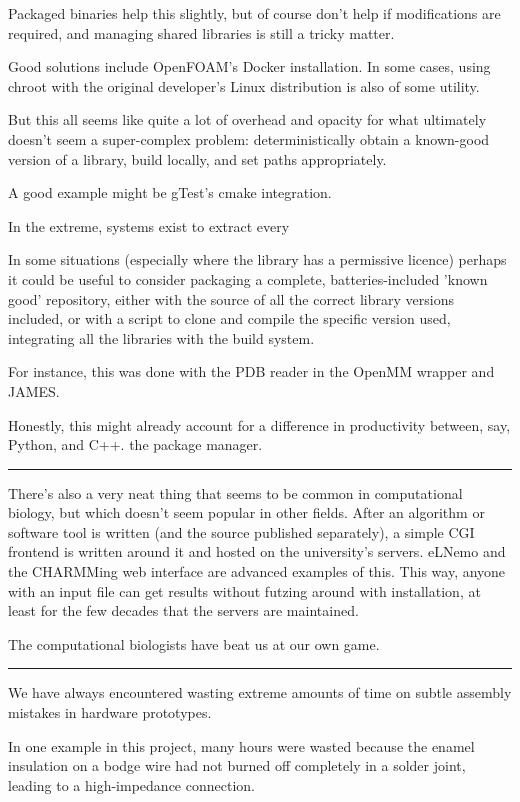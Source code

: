 \documentclass[paper.tex]{subfiles}
\begin{document}
Packaged binaries help this slightly, but of course don't help if modifications are required, and managing shared libraries is still a tricky matter.

Good solutions include OpenFOAM's Docker installation. In some cases, using chroot with the original developer's Linux distribution is also of some utility.

But this all seems like quite a lot of overhead and opacity for what ultimately doesn't seem a super-complex problem: deterministically obtain a known-good version of a library, build locally, and set paths appropriately.

A good example might be gTest's cmake integration.

In the extreme, systems exist to extract every 

In some situations (especially where the library has a permissive licence) perhaps it could be useful to consider packaging a complete, batteries-included 'known good' repository, either with the source of all the correct library versions included, or with a script to clone and compile the specific version used, integrating all the libraries with the build system. 

For instance, this was done with the PDB reader in the OpenMM wrapper and JAMES.

Honestly, this might already account for a difference in productivity between, say, Python, and C++. the package manager.

\rule{\linewidth}{0.2pt}

There's also a very neat thing that seems to be common in computational biology, but which doesn't seem popular in other fields. After an algorithm or software tool is written (and the source published separately), a simple CGI frontend is written around it and hosted on the university's servers. eLNemo and the CHARMMing web interface are advanced examples of this. This way, anyone with an input file can get results without futzing around with installation, at least for the few decades that the servers are maintained.

The computational biologists have beat us at our own game.

\rule{\linewidth}{0.2pt}

We have always encountered wasting extreme amounts of time on subtle assembly mistakes in hardware prototypes. 

In one example in this project, many hours were wasted because the enamel insulation on a bodge wire had not burned off completely in a solder joint, leading to a high-impedance connection.
\end{document}
